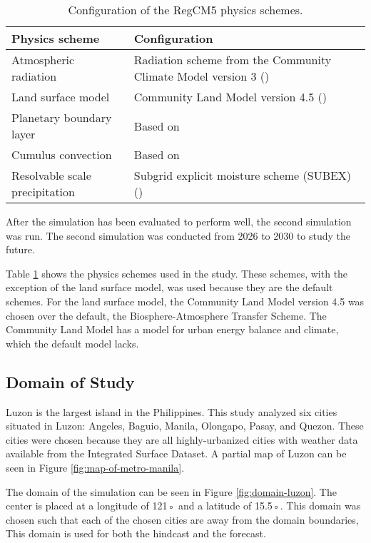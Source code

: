 	\begin{table}	
		\caption{Configuration of the RegCM5 physics schemes.}
		\label{tab:physics-schemes}
		\centering
		\begin{tabular}{l l}
			\hline \hline
			Physics scheme & Configuration\\
			\hline
			Atmospheric radiation & Radiation scheme from the Community Climate Model version 3 (\cite{Kiehl1996}) \\
			Land surface model & Community Land Model version 4.5 (\cite{Oleson2013})\\
			Planetary boundary layer & Based on \textcite{Holtslag1990}\\
			Cumulus convection & Based on \textcite{Emanuel1991}\\
			Resolvable scale precipitation & Subgrid explicit moisture scheme (SUBEX) (\cite{Pal2000})\\
			\hline
		\end{tabular}		
	\end{table}
	
	After the simulation has been evaluated to perform well, the second simulation was run.
	The second simulation was conducted from 2026 to 2030 to study the future.
	
	Table \ref{tab:physics-schemes} shows the physics schemes used in the study.
	These schemes, with the exception of the land surface model, was used because they are the default schemes. 
	For the land surface model, the Community Land Model version 4.5 was chosen over the default, the Biosphere-Atmosphere Transfer Scheme. 
	The Community Land Model has a model for urban energy balance and climate, which the default model lacks.
	
	\subsection{Domain of Study}
		Luzon is the largest island in the Philippines.
		This study analyzed six cities situated in Luzon:
		Angeles,
		Baguio,
		Manila,
		Olongapo,
		Pasay,
		and
		Quezon.
		These cities were chosen because they are all highly-urbanized cities with weather data available from the Integrated Surface Dataset.
		A partial map of Luzon can be seen in Figure \ref{fig:map-of-metro-manila}.
		
		The domain of the simulation can be seen in Figure \ref{fig:domain-luzon}.
		The center is placed at a longitude of 121◦ and a latitude of 15.5◦.
		This domain was chosen such that each of the chosen cities are away from the domain boundaries,
		This domain is used for both the hindcast and the forecast.
		
